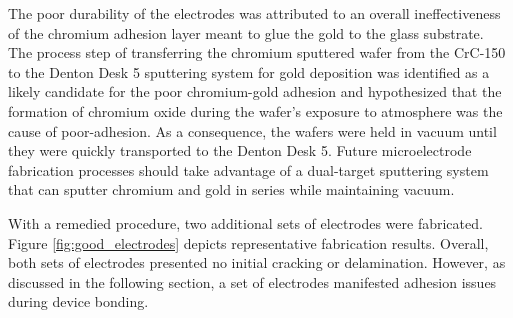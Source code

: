 \par The poor durability of the electrodes was attributed to an overall ineffectiveness of the chromium adhesion layer meant to glue the gold to the glass substrate. The process step of transferring the chromium sputtered wafer from the CrC-150 to the Denton Desk 5 sputtering system for gold deposition was identified as a likely candidate for the poor chromium-gold adhesion and hypothesized that the formation of chromium oxide during the wafer's exposure to atmosphere was the cause of poor-adhesion. As a consequence, the wafers were held in vacuum until they were quickly transported to the Denton Desk 5. Future microelectrode fabrication processes should take advantage of a dual-target sputtering system that can sputter chromium and gold in series while maintaining vacuum.  

\par With a remedied procedure, two additional sets of electrodes were fabricated. Figure \ref{fig:good_electrodes} depicts representative fabrication results. Overall, both sets of electrodes presented no initial cracking or delamination. However, as discussed in the following section, a set of electrodes manifested adhesion issues during device bonding.

